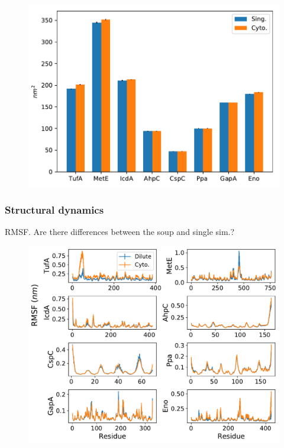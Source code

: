 \documentclass[journal=jacsat,manuscript=article]{achemso}
\begin{document}
\begin{figure}
\includegraphics[scale=0.6]{sasa.pdf}
\end{figure}

\subsubsection{Structural dynamics}
RMSF. Are there differences between the soup and single sim.?

\begin{figure}
\includegraphics[scale=0.6]{rmsf.pdf}
\end{figure}
\end{document}
